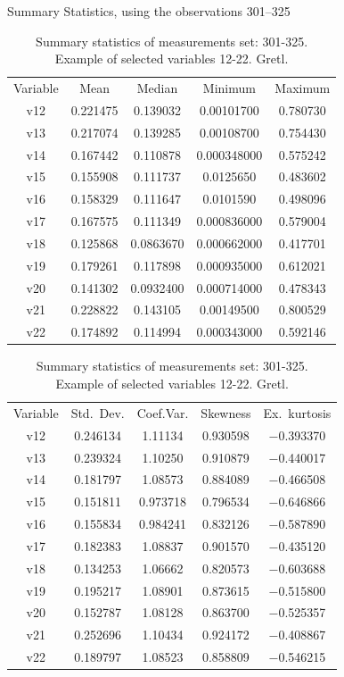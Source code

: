 \documentclass[10pt, a4paper]{article}
\begin{document}
\begin{appendices}
\begin{table}[H]
\begin{center}
\caption{Summary statistics of measurements set: 301-325. \\ Example of selected variables 12-22. Gretl.­}
Summary Statistics, using the observations 301--325\\
\vspace{8pt}
\begin{tabular}{|c|c|c|c|c|}
Variable & {Mean}& {Median}  & {Minimum}    & {Maximum} \\[1ex]
v12 & 0.221475 & 0.139032 & 0.00101700 & 0.780730\\
v13 & 0.217074 & 0.139285 & 0.00108700 & 0.754430\\
v14 & 0.167442 & 0.110878 & 0.000348000 & 0.575242\\
v15 & 0.155908 & 0.111737 & 0.0125650 & 0.483602\\
v16 & 0.158329 & 0.111647 & 0.0101590 & 0.498096\\
v17 & 0.167575 & 0.111349 & 0.000836000 & 0.579004\\
v18 & 0.125868 & 0.0863670 & 0.000662000 & 0.417701\\
v19 & 0.179261 & 0.117898 & 0.000935000 & 0.612021\\
v20 & 0.141302 & 0.0932400 & 0.000714000 & 0.478343\\
v21 & 0.228822 & 0.143105 & 0.00149500 & 0.800529\\
v22 & 0.174892 & 0.114994 & 0.000343000 & 0.592146\\ \hline\hline
\end{tabular}
\begin{tabular}{|c|c|c|c|c|}
\rowcolors{1}{Lavender}{MintCream}
Variable &  {Std.\ Dev.}  & {Coef.Var.}   & {Skewness}    & {Ex.\ kurtosis} \\[1ex]
v12 & 0.246134 & 1.11134 & 0.930598 & $-$0.393370\\
v13 & 0.239324 & 1.10250 & 0.910879 & $-$0.440017\\
v14 & 0.181797 & 1.08573 & 0.884089 & $-$0.466508\\
v15 & 0.151811 & 0.973718 & 0.796534 & $-$0.646866\\
v16 & 0.155834 & 0.984241 & 0.832126 & $-$0.587890\\
v17 & 0.182383 & 1.08837 & 0.901570 & $-$0.435120\\
v18 & 0.134253 & 1.06662 & 0.820573 & $-$0.603688\\
v19 & 0.195217 & 1.08901 & 0.873615 & $-$0.515800\\
v20 & 0.152787 & 1.08128 & 0.863700 & $-$0.525357\\
v21 & 0.252696 & 1.10434 & 0.924172 & $-$0.408867\\
v22 & 0.189797 & 1.08523 & 0.858809 & $-$0.546215\\
\end{tabular}
\end{center}
\end{table}


\end{appendices}
\end{document}
